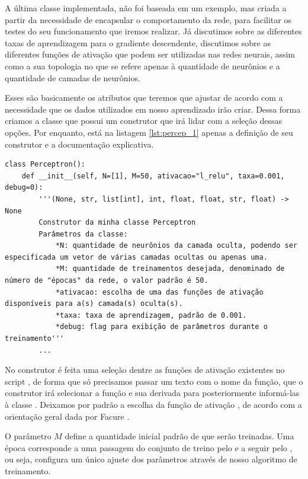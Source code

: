 A última classe implementada, não foi baseada em um exemplo, mas criada a partir da necessidade de encapsular o comportamento da rede, para facilitar os testes do seu funcionamento que iremos realizar. Já discutimos sobre as diferentes taxas de aprendizagem para o gradiente descendente, discutimos sobre as diferentes funções de ativação que podem ser utilizadas nas redes neurais, assim como a sua topologia no que se refere apenas à quantidade de neurônios e a quantidade de camadas de neurônios.

Esses são basicamente os atributos que teremos que ajustar de acordo com a necessidade que os dados utilizados em nosso aprendizado irão criar. Dessa forma criamos a classe  que possui um construtor que irá lidar com a seleção dessas opções. Por enquanto, está na listagem \ref{lst:percep_1} apenas a definição de seu construtor e a documentação explicativa.
\newline
\estiloR
\begin{lstlisting}[caption={Trecho da classe \eng{Perceptron}}, label={lst:percep_1}, escapeinside={\%}]
class Perceptron():
    def __init__(self, N=[1], M=50, ativacao="l_relu", taxa=0.001, debug=0):
	    '''(None, str, list[int], int, float, float, str, float) -> None
	    Construtor da minha classe Perceptron
	    Parâmetros da classe:
	    	*N: quantidade de neurônios da camada oculta, podendo ser especificada um vetor de várias camadas ocultas ou apenas uma.
	    	*M: quantidade de treinamentos desejada, denominado de número de "épocas" da rede, o valor padrão é 50.
	    	*ativacao: escolha de uma das funções de ativação disponíveis para a(s) camada(s) oculta(s).
	    	*taxa: taxa de aprendizagem, padrão de 0.001.
	    	*debug: flag para exibição de parâmetros durante o treinamento'''
	    ...
\end{lstlisting}

No construtor é feita uma seleção dentre as funções de ativação existentes no script , de forma que só precisamos passar um texto com o nome da função, que o construtor irá selecionar a função e sua derivada para posteriormente informá-las à classe . Deixamos por padrão a escolha da função de ativação , de acordo com a orientação geral dada por Facure \citep{matheus}.

O parâmetro $M$ define a quantidade inicial padrão de  que serão treinadas. Uma época corresponde a uma passagem do conjunto de treino pelo  e a seguir pelo , ou seja, configura um único ajuste dos parâmetros através de nosso algoritmo de treinamento.

